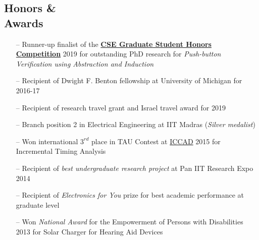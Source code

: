 \documentclass[margin,line,letter]{resume}
\begin{document}
\begin{resume}
\section{\mysidestyle Honors \& \\ Awards}
    \noindent
    \begin{itemize}[leftmargin=*]
    \item[--] Runner-up finalist of the \href{https://cse.engin.umich.edu/stories/2019-cse-graduate-student-honors-competition-highlights-outstanding-research}{\textbf{CSE Graduate Student Honors Competition}} 2019 for outstanding PhD research for \textit{Push-button Verification using Abstraction and Induction}
    \item[--] Recipient of Dwight F. Benton fellowship at University of Michigan for 2016-17
    \item[--] Recipient of research travel grant and Israel travel award for 2019
    \item[--] Branch position 2 in Electrical Engineering at IIT Madras (\textit{Silver medalist})
    \item[--] Won international $3^{rd}$ place in TAU Contest at \href{https://iccad.com/}{ICCAD} 2015 for Incremental Timing Analysis
    \item[--] Recipient of \textit{best undergraduate research project} at Pan IIT Research Expo 2014
    \item[--] Recipient of \textit{Electronics for You} prize for best academic performance at graduate level
    \item[--] Won \textit{National Award} for the Empowerment of Persons with Disabilities 2013 for Solar Charger for Hearing Aid Devices
    \end{itemize}


\end{resume}
\end{document}
